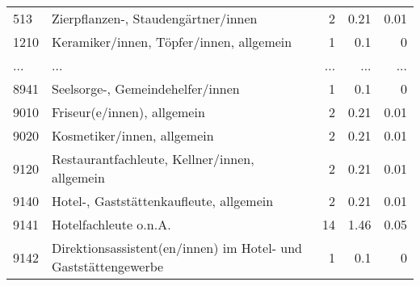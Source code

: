 \begin{longtable}{lXrrr}
        513 & \multicolumn{1}{X}{Zierpflanzen-, Staudengärtner/innen} & %
          \num{2} &
          \num[round-mode=places,round-precision=2]{0,21} &
          \num[round-mode=places,round-precision=2]{0,01} \\
        1210 & \multicolumn{1}{X}{Keramiker/innen, Töpfer/innen, allgemein} & %
          \num{1} &
          \num[round-mode=places,round-precision=2]{0,1} &
          \num[round-mode=places,round-precision=2]{0} \\
       ... & ... & ... & ... & ... \\
        8941 & \multicolumn{1}{X}{Seelsorge-, Gemeindehelfer/innen} & %
          \num{1} &
          \num[round-mode=places,round-precision=2]{0,1} &
          \num[round-mode=places,round-precision=2]{0} \\

        9010 & \multicolumn{1}{X}{Friseur(e/innen), allgemein} & %
          \num{2} &
          \num[round-mode=places,round-precision=2]{0,21} &
          \num[round-mode=places,round-precision=2]{0,01} \\

        9020 & \multicolumn{1}{X}{Kosmetiker/innen, allgemein} & %
          \num{2} &
          \num[round-mode=places,round-precision=2]{0,21} &
          \num[round-mode=places,round-precision=2]{0,01} \\

        9120 & \multicolumn{1}{X}{Restaurantfachleute, Kellner/innen, allgemein} & %
          \num{2} &
          \num[round-mode=places,round-precision=2]{0,21} &
          \num[round-mode=places,round-precision=2]{0,01} \\

        9140 & \multicolumn{1}{X}{Hotel-, Gaststättenkaufleute, allgemein} & %
          \num{2} &
          \num[round-mode=places,round-precision=2]{0,21} &
          \num[round-mode=places,round-precision=2]{0,01} \\

        9141 & \multicolumn{1}{X}{Hotelfachleute o.n.A.} & %
          \num{14} &
          \num[round-mode=places,round-precision=2]{1,46} &
          \num[round-mode=places,round-precision=2]{0,05} \\

        9142 & \multicolumn{1}{X}{Direktionsassistent(en/innen) im Hotel- und Gaststättengewerbe} & %
          \num{1} &
          \num[round-mode=places,round-precision=2]{0,1} &
          \num[round-mode=places,round-precision=2]{0} \\


\end{longtable}
